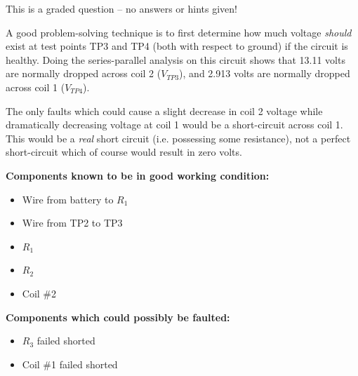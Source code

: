 \vfil 

\eject






This is a graded question -- no answers or hints given!







A good problem-solving technique is to first determine how much voltage {\it should} exist at test points TP3 and TP4 (both with respect to ground) if the circuit is healthy.  Doing the series-parallel analysis on this circuit shows that 13.11 volts are normally dropped across coil 2 ($V_{TP3}$), and 2.913 volts are normally dropped across coil 1 ($V_{TP4}$).

The only faults which could cause a slight decrease in coil 2 voltage while dramatically decreasing voltage at coil 1 would be a short-circuit across coil 1.  This would be a {\it real} short circuit (i.e. possessing some resistance), not a perfect short-circuit which of course would result in zero volts.

\vskip 10pt

\goodbreak
\noindent
{\bf Components known to be in good working condition:}

\begin{itemize}
\item{} Wire from battery to $R_1$
\item{} Wire from TP2 to TP3
\item{} $R_1$
\item{} $R_2$
\item{} Coil \#2
\end{itemize}

\vskip 10pt

\goodbreak
\noindent
{\bf Components which could possibly be faulted:}

\begin{itemize}
\item{} $R_3$ failed shorted
\item{} Coil \#1 failed shorted
\end{itemize}




